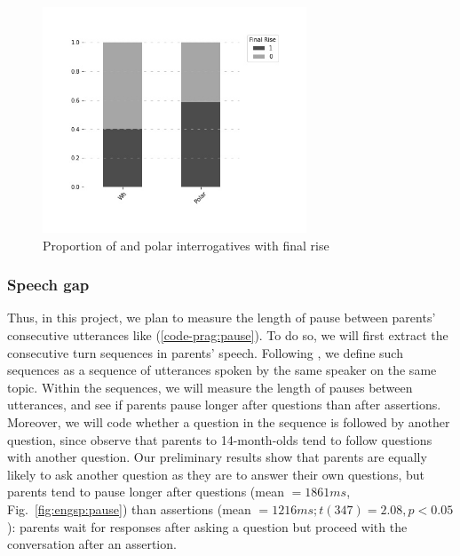 \begin{figure}[H]
    \centering
    \includegraphics[width=0.7\textwidth]{figures/rise-int.jpg}
    \caption{Proportion of \twh{} and polar interrogatives with final rise}
    \label{fig:}
\end{figure}

\subsubsection{Speech gap}
\label{sec:engsp:results:pause}

 Thus, in this project, we plan to measure the length of pause between parents’ consecutive utterances like (\ref{code-prag:pause}). To do so, we will first extract the consecutive turn sequences in parents’ speech. Following \cite{reimchen2017}, we define such sequences as a sequence of utterances spoken by the same speaker on the same topic. Within the sequences, we will measure the length of pauses between utterances, and see if parents pause longer after questions than after assertions. Moreover, we will code whether a question in the sequence is followed by another question, since \cite{reimchen2017} observe that parents to 14-month-olds tend to follow questions with another question. Our preliminary results show that parents are equally likely to ask another question as they are to answer their own questions, but parents tend to pause longer after questions (mean $= 1861ms$, Fig.~\ref{fig:engsp:pause}) than assertions (mean $= 1216ms; t(347) = 2.08, p <0.05$): parents wait for responses after asking a question but proceed with the conversation after an assertion. 




